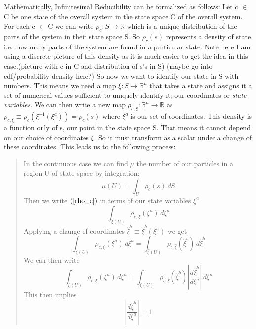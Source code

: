 \documentclass{article}
\begin{document}
	Mathematically, Infinitesimal Reducibility can be formalized as follows: Let c $\in$ C be one state of the overall system in the state space C of the overall system. For each c $\in$ C we can write $\rho_c: S \rightarrow \mathbb{R}$ which is a unique distribution of the parts of the system in their state space S. So $\rho_c(s)$ represents a density of state i.e. how many parts of the system are found in a particular state. Note here I am using a discrete picture of this density as it is much easier to get the idea in this case.(picture with c in C and distribution of s's in S) (maybe go into cdf/probability density here?) So now we want to identify our state in S with numbers. This means we need a map $\xi : S \rightarrow \mathbb{R}^n $ that takes a state and assigns it a set of numerical values sufficient to uniquely identify it; our coordinates or \textit{state variables}. We can then write a new map $\rho_{c,\xi} : \mathbb{R}^n \rightarrow \mathbb{R}$ as $\rho_{c,\xi} \equiv \rho_c(\xi^{-1}(\xi^a)) = \rho_c(s)$ where $\xi^a$ is our set of coordinates. This density is a function only of s, our point in the state space S. That means it cannot depend on our choice of coordinates $\xi$. So it must transform as a scalar under a change of these coordinates. This leads us to the following process:
	
\begin{quote}
In the continuous case we can find $\mu$ the number of our particles in a region U of state space by integration:
	\begin{equation}
	\label{rho_c}
	\mu(U) = \int_{U} \rho_c(s)\, dS
	\end{equation}
Then we write $(\ref{rho_c})$ in terms of our state variables $\xi^a$ 
	\begin{equation}
	\label{rho_xia}
	\int_{\xi(U)} \rho_{c,\xi}(\xi^a) \, d\xi^a
	\end{equation}
Applying a change of coordinates $\hat{\xi}^b \equiv \hat{\xi}^b(\xi^a)$ we get
	\begin{equation}
	\label{rho_xib}
	\int_{\xi(U)} \rho_{c,\xi}(\xi^a) \, d\xi^a = \int_{\hat{\xi}(U)} \rho_{c,\hat{\xi}}(\hat{\xi}^b) \, d\hat{\xi}^b
	\end{equation}
We can then write
	\begin{equation}
	\label{rho_J}
	\int_{\xi(U)} \rho_{c,\xi}(\xi^a) \, d\xi^a = \int_{\xi(U)} \rho_{c,\hat{\xi}}(\hat{\xi}^b) |\frac{d\hat{\xi}^b}{d\xi^a}| \, d\xi^a
	\end{equation}
This then implies
	\begin{equation}
	\label{}
	|\frac{d\hat{\xi}^b}{d\xi^a}| = 1
	\end{equation}
\end{quote}
\end{document}
